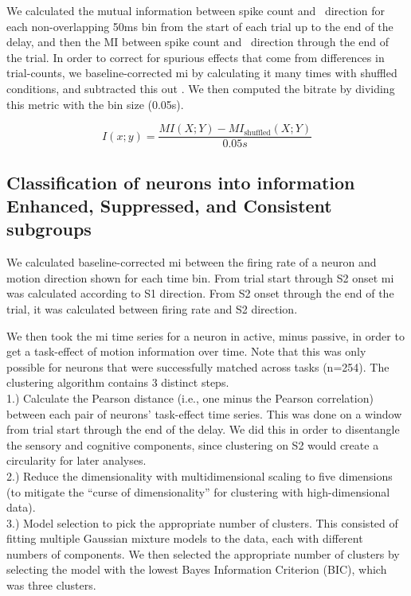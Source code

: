 We calculated the mutual information between spike count and \sample\ direction for each non-overlapping 50ms bin from the start of each trial up to the end of the delay, and then the MI between spike count and \test\ direction through the end of the trial. In order to correct for spurious effects that come from differences in trial-counts, we baseline-corrected \gls{mi} by calculating it many times with shuffled conditions, and subtracted this out \parencite{Hatsopoulos1998}. We then computed the bitrate by dividing this metric with the bin size (0.05s).

\begin{equation}
I(x;y) = \frac{MI(X;Y)- MI_\textrm{shuffled}(X;Y)}{0.05s}
\end{equation}


\subsection*{Classification of neurons into information Enhanced, Suppressed, and Consistent subgroups}
We calculated baseline-corrected \gls{mi} between the firing rate of a neuron and motion direction shown for each time bin. From trial start through S2 onset \gls{mi} was calculated according to S1 direction. From S2 onset through the end of the trial, it was calculated between firing rate and S2 direction. 

We then took the \gls{mi} time series for a neuron in active, minus passive, in order to get a task-effect of motion information over time. Note that this was only possible for neurons that were successfully matched across tasks (n=254). The clustering algorithm contains 3 distinct steps.\\

1.) Calculate the Pearson distance (i.e., one minus the Pearson correlation) between each pair of neurons' task-effect time series. This was done on a window from trial start through the end of the delay. We did this in order to disentangle the sensory and cognitive components, since clustering on S2 would create a circularity for later analyses. \\

2.) Reduce the dimensionality with multidimensional scaling to five dimensions (to mitigate the ``curse of dimensionality'' for clustering with high-dimensional data).\\

3.) Model selection to pick the appropriate number of clusters. This consisted of fitting multiple Gaussian mixture models to the data, each with different numbers of components. We then selected the appropriate number of clusters by selecting the model with the lowest Bayes Information Criterion (BIC), which was three clusters.\\

